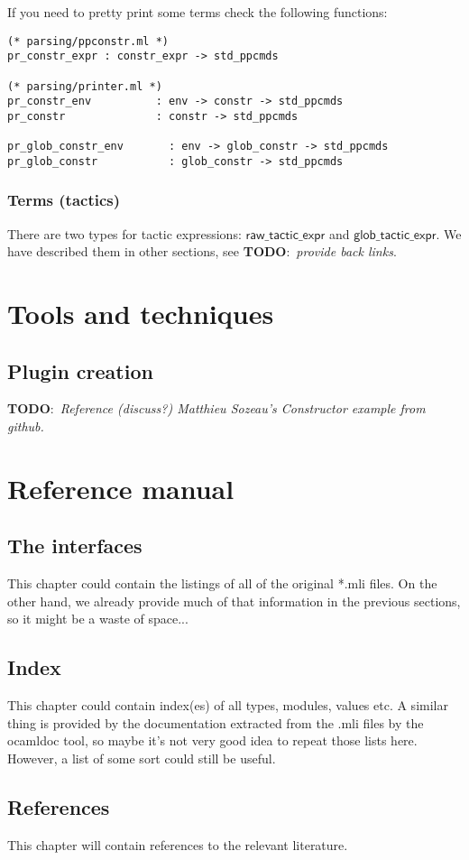 \documentclass[a4paper,oneside]{book}
\newcommand{\m}[1]{\ensuremath{\mathsf{#1}}}
\newcommand{\TODO}[1]{\textbf{TODO}:\ \emph{#1}}
\begin{document}
If you need to pretty print some terms check the following functions:

\begin{lstlisting}
(* parsing/ppconstr.ml *)
pr_constr_expr : constr_expr -> std_ppcmds

(* parsing/printer.ml *)
pr_constr_env          : env -> constr -> std_ppcmds
pr_constr              : constr -> std_ppcmds

pr_glob_constr_env       : env -> glob_constr -> std_ppcmds
pr_glob_constr           : glob_constr -> std_ppcmds
\end{lstlisting}

\section{Terms (tactics)}

There are two types for tactic expressions: \m{raw\_tactic\_expr} and
\m{glob\_tactic\_expr}. We have described them in other sections, see
\TODO{provide back links}.

\part{Tools and techniques}

\chapter{Plugin creation}

\TODO{Reference (discuss?) Matthieu Sozeau's Constructor example from
  github.}

\part{Reference manual}

\chapter{The interfaces}

This chapter could contain the listings of all of the original *.mli
files. On the other hand, we already provide much of that information
in the previous sections, so it might be a waste of space...

\chapter{Index}

This chapter could contain index(es) of all types, modules, values
etc. A similar thing is provided by the documentation extracted from
the .mli files by the ocamldoc tool, so maybe it's not very good idea
to repeat those lists here. However, a list of some sort could still
be useful.

\chapter{References}

This chapter will contain references to the relevant literature.
\end{document}
